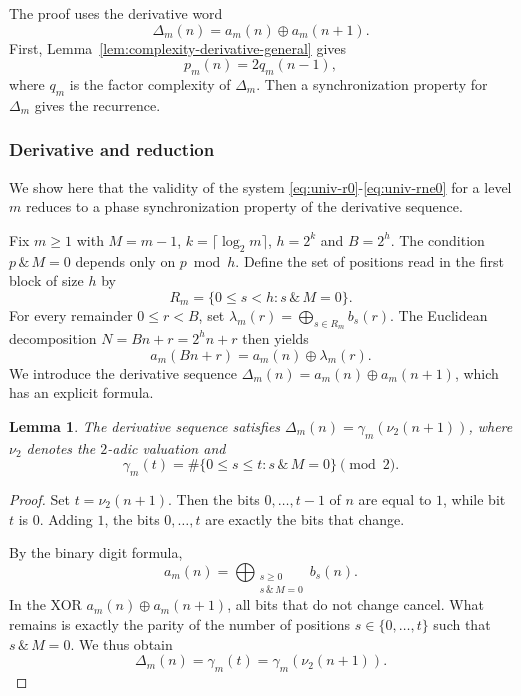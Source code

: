 \documentclass[12pt,reqno]{article}
\theoremstyle{plain}
\newtheorem{lemma}[theorem]{Lemma}
\theoremstyle{definition}
\begin{document}
The proof uses the derivative word
\[
  \Delta_m(n)=a_m(n)\oplus a_m(n+1).
\]
First, Lemma~\ref{lem:complexity-derivative-general} gives
\[
  p_m(n)=2q_m(n-1),
\]
where \(q_m\) is the factor complexity of \(\Delta_m\). Then a
synchronization property for \(\Delta_m\) gives the recurrence.

\subsubsection{Derivative and reduction}

\label{subsec:reduction-generale}

We show here that the validity of the system \eqref{eq:univ-r0}-\eqref{eq:univ-rne0} for a level $m$ reduces to a phase synchronization property of the derivative sequence.

Fix $m \ge 1$ with $M = m-1$, $k = \lceil \log_2 m \rceil$, $h = 2^k$ and $B = 2^h$. The condition $p\,\&\,M=0$ depends only on $p \bmod h$. Define the set of positions read in the first block of size $h$ by
\[
R_m = \{0 \le s < h : s\,\&\,M = 0\}.
\]
For every remainder $0 \le r < B$, set $\lambda_m(r) = \bigoplus_{s \in R_m} b_s(r)$. The Euclidean decomposition $N = Bn+r = 2^h n + r$ then yields
\[
a_m(Bn+r) = a_m(n) \oplus \lambda_m(r).
\]
We introduce the derivative sequence $\Delta_m(n) = a_m(n) \oplus a_m(n+1)$, which has an explicit formula.

\begin{lemma}\label{lem:derivative-formula}
The derivative sequence satisfies $\Delta_m(n) = \gamma_m(\nu_2(n+1))$,
where $\nu_2$ denotes the $2$-adic valuation and
\[
\gamma_m(t) = \#\{0 \le s \le t : s\,\&\,M = 0\} \pmod 2.
\]
\end{lemma}

\begin{proof}
Set $t = \nu_2(n+1)$. Then the bits $0, \dots, t-1$ of $n$ are equal to $1$, while bit $t$ is $0$. Adding $1$, the bits $0, \dots, t$ are exactly the bits that change.

By the binary digit formula,
\[
  a_m(n) = \bigoplus_{\substack{s \ge 0 \\ s\,\&\,M = 0}} b_s(n).
\]
In the XOR $a_m(n) \oplus a_m(n+1)$, all bits that do not change cancel. What remains is exactly the parity of the number of positions $s \in \{0, \dots, t\}$ such that $s\,\&\,M = 0$. We thus obtain
\[
  \Delta_m(n) = \gamma_m(t) = \gamma_m(\nu_2(n+1)).
\]
\end{proof}
\end{document}
